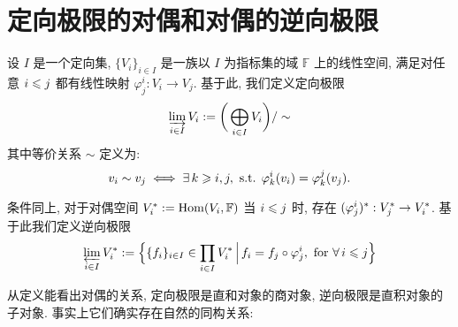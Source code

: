 \chapter{定向极限的对偶和对偶的逆向极限}
\begin{definition}[定向极限]
    设 $I$ 是一个定向集, $\{V_i\}_{i\in I}$ 是一族以 
    $I$ 为指标集的域 $\mathbb{F}$ 上的线性空间, 
    满足对任意 $i\leqslant j$ 都有线性映射 
    $\varphi^i_j:V_i\to V_j$. 
    基于此, 我们定义定向极限
    \begin{equation*}
        \varinjlim_{i\in I} V_i := 
        \bigg(\bigoplus_{i\in I} V_i\bigg)/\sim
    \end{equation*}
    其中等价关系 $\sim$ 定义为:
    \begin{equation*}
        v_i \sim v_j \iff \exists\, k\geqslant i,j, 
        \text{ s.t. }\varphi^i_k(v_i)=\varphi^j_k(v_j).
    \end{equation*}
\end{definition}

\begin{definition}[逆向极限]
    条件同上, 对于对偶空间 $V_i^*:=\mathrm{Hom}(V_i,\mathbb{F})$ 
    当 $i\leqslant j$ 时, 存在 $(\varphi^i_j)^*:V_j^*\rightarrow V_i^*$. 
    基于此我们定义逆向极限
    \begin{equation*}
        \varprojlim_{i\in I} V_i^* := 
        \Big\{\{f_i\}_{i\in I}\in\prod_{i \in I}V_i^*\,\Big|\,
        f_i=f_j\circ\varphi^i_j,\text{ for }\forall\, i\leqslant j\Big\}
    \end{equation*}
\end{definition}

从定义能看出对偶的关系, 定向极限是直和对象的商对象, 
逆向极限是直积对象的子对象. 事实上它们确实存在自然的同构关系:

